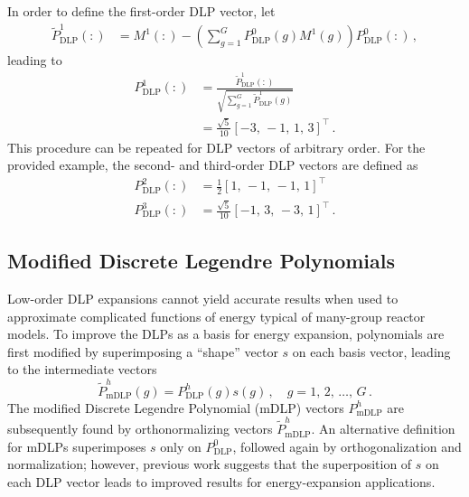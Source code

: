\documentclass[5p,times,twocolumn,10pt]{elsarticle}
\begin{document}
    In order to define the  first-order DLP vector, let
    \begin{equation}
        \begin{split}
            \tilde{P}_{\text{DLP}}^1(:) &= M^1(:) - \left ( \sum_{g=1}^{G}
            P_{\text{DLP}}^0(g) M^1(g) \right ) P_{\text{DLP}}^0(:)   \, ,
        \end{split}
    \end{equation}
    leading to
    \begin{equation}
        \begin{split}
            P_{\text{DLP}}^1(:) &=
            \frac{\tilde{P}_{\text{DLP}}^1(:)}{\sqrt{\sum_{g=1}^{G}
                    \tilde{P}_{\text{DLP}}^1(g)}} \\
            &= \frac{\sqrt{5}}{10} [-3,\,-1,\,1,\,3]^{\intercal} \, .
        \end{split}
    \end{equation}
    This procedure can be repeated for DLP vectors of arbitrary order.
    For the provided example, the second- and third-order DLP
    vectors are defined as
    \begin{equation}
        \begin{split}
            P_{\text{DLP}}^2(:)  &= \frac{1}{2} [1,\,-1,\,-1,\,1]^{\intercal} \\
            P_{\text{DLP}}^3(:)  &= \frac{\sqrt{5}}{10}
            [-1,\,3,\,-3,\,1]^{\intercal} \, .
        \end{split}
    \end{equation}

    \subsection{Modified Discrete Legendre Polynomials}

    Low-order DLP expansions cannot
    yield accurate results when used to approximate
    complicated functions of energy typical of many-group reactor models.
    To improve the DLPs as a basis for energy expansion,
    polynomials are first modified by superimposing a ``shape'' vector $s$
    on each basis vector, leading to the intermediate vectors
    \begin{equation}
        \tilde{P}^h_{\text{mDLP}}(g) =
        P^h_{\text{DLP}}(g) s(g) \,, \quad g = 1,\, 2,\, \ldots ,\, G \, .
    \end{equation}
    The modified Discrete Legendre Polynomial (mDLP) vectors
    $P^h_{\text{mDLP}}$ are subsequently found by
    orthonormalizing vectors $\tilde{P}^h_{\text{mDLP}}$.  An alternative
    definition for mDLPs superimposes $s$ only on $P^0_{\text{DLP}}$,
    followed again by orthogonalization and normalization; however,
    previous work suggests that the superposition of $s$ on each
    DLP vector leads to improved results for energy-expansion
    applications\cite{roberts2014psb}.
\end{document}
